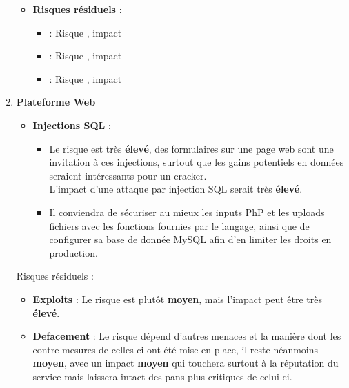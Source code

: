 \documentclass[a4paper,10pt,final,fleqn]{article}
\begin{document}
\begin{enumerate}
\begin{itemize}
							\item \textbf{Risques résiduels} : \\

								\begin{itemize}
									\item \textbf{} : Risque , impact 
									\item \textbf{} : Risque , impact 
									\item \textbf{} : Risque , impact \\
								\end{itemize}
						\end{itemize}
						
					\item \textbf{Plateforme Web}

						\begin{itemize}
							\item \textbf{Injections SQL} : \\

								\begin{itemize}
									\item Le risque est très \textbf{élevé}, des formulaires sur une page web sont une invitation à ces injections, surtout que les gains potentiels en données seraient intéressants pour un cracker.\\ L'impact d'une attaque par injection SQL serait très \textbf{élevé}.\\
									\item Il conviendra de sécuriser au mieux les inputs PhP et les uploads fichiers avec les fonctions fournies par le langage, ainsi que de configurer sa base de donnée MySQL afin d'en limiter les droits en production.\\
								\end{itemize}


						\end{itemize}


						Risques résiduels : \\

						\begin{itemize}
							\item \textbf{Exploits} : Le risque est plutôt \textbf{moyen}, mais l'impact peut être très \textbf{élevé}.\\
							\item \textbf{Defacement} : Le risque dépend d'autres menaces et la manière dont les contre-mesures de celles-ci ont été mise en place, il reste néanmoins \textbf{moyen}, avec un impact \textbf{moyen} qui touchera surtout à la réputation du service mais laissera intact des pans plus critiques de celui-ci.\\
						\end{itemize}


\end{enumerate}
\end{document}
